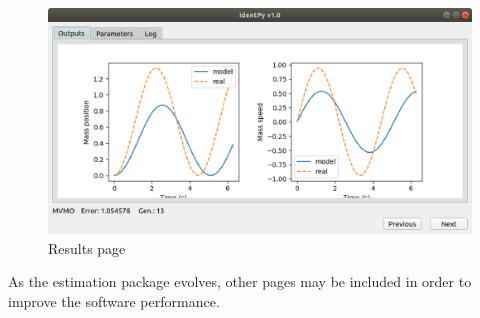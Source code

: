 \begin{figure}[h]
	\caption{Results page}
	\begin{center}
		\includegraphics[scale=.5]{Images/Software_results_page.eps}
	\end{center}
	\label{fig: final_pg}
\end{figure}

As the estimation package evolves, other pages may be included in order to improve the software performance.